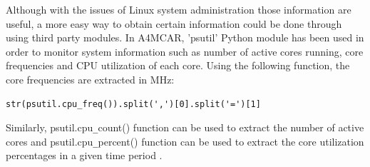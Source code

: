 Although with the issues of Linux system administration those information are useful, a more easy way to obtain certain information could be done through using third party modules. In A4MCAR, 'psutil' Python module has been used in order to monitor system information such as number of active cores running, core frequencies and CPU utilization of each core. 
Using the following function, the core frequencies are extracted in MHz:
\begin{lstlisting}[style=python]
	str(psutil.cpu_freq()).split(',')[0].split('=')[1]
\end{lstlisting}
Similarly, psutil.cpu\texttt{\_}count() function can be used to extract the number of active cores and psutil.cpu\texttt{\_}percent() function can be used to extract the core utilization percentages in a given time period \cite{psutil}. 

